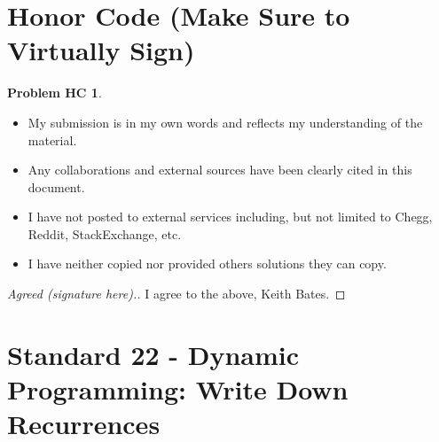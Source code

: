 \documentclass[11pt]{article}
\theoremstyle{definition}
\theoremstyle{definition}
\newtheorem*{requiredHC}{Problem HC}
\theoremstyle{definition}
\begin{document}
\newpage
\section*{Honor Code (Make Sure to Virtually Sign)} \label{HonorCode}
\hypertarget{HonorCode}{}

\begin{requiredHC}
\begin{itemize}
\item My submission is in my own words and reflects my understanding of the material.
\item Any collaborations and external sources have been clearly cited in this document.
\item I have not posted to external services including, but not limited to Chegg, Reddit, StackExchange, etc.
\item I have neither copied nor provided others solutions they can copy.
\end{itemize}

\end{requiredHC}

\begin{proof}[Agreed (signature here).]
I agree to the above, Keith Bates.
\end{proof}


\newpage
\setcounter{section}{21}
\section{Standard 22 - Dynamic Programming: Write Down Recurrences}

\setcounter{required}{0}
\end{document}
